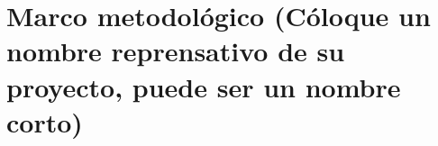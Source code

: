 \chapter{Marco metodológico (Cóloque un nombre reprensativo de su proyecto, puede ser un nombre corto)}
\label{ch:solucion}

